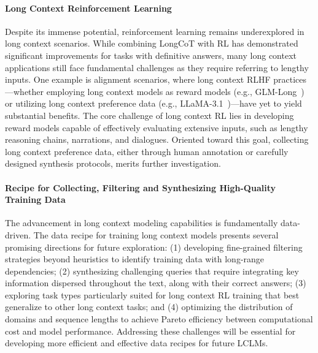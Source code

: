 \documentclass[11pt, a4paper, logo, copyright, nonumbering]{map}
\begin{document}
\paragraph{Long Context Reinforcement Learning} Despite its immense potential, reinforcement learning remains underexplored in long context scenarios. While combining LongCoT with RL has demonstrated significant improvements for tasks with definitive answers, many long context applications still face fundamental challenges as they require referring to lengthy inputs. One example is alignment scenarios, where long context RLHF practices—whether employing long context models as reward models (e.g., GLM-Long~\citep{glm2024chatglm}) or utilizing long context preference data (e.g., LLaMA-3.1~\citep{grattafiori2024llama})—have yet to yield substantial benefits. The core challenge of long context RL lies in developing reward models capable of effectively evaluating extensive inputs, such as lengthy reasoning chains, narrations, and dialogues. Oriented toward this goal, collecting long context preference data, either through human annotation or carefully designed synthesis protocols, merits further investigation.

\paragraph{Recipe for Collecting, Filtering and Synthesizing High-Quality Training Data} The advancement in long context modeling capabilities is fundamentally data-driven. The data recipe for training long context models presents several promising directions for future exploration: (1) developing fine-grained filtering strategies beyond heuristics to identify training data with long-range dependencies; (2) synthesizing challenging queries that require integrating key information dispersed throughout the text, along with their correct answers; (3) exploring task types particularly suited for long context RL training that best generalize to other long context tasks; and (4) optimizing the distribution of domains and sequence lengths to achieve Pareto efficiency between computational cost and model performance. Addressing these challenges will be essential for developing more efficient and effective data recipes for future LCLMs. 
\end{document}
